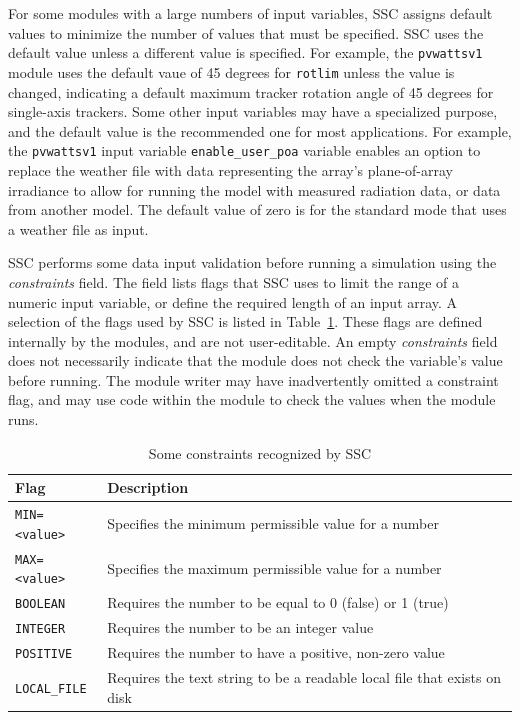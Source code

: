 \documentclass{scrartcl} %
\newcommand{\+}{\discretionary{\mbox{\scriptsize$\hookleftarrow$}}{}{}}
\begin{document}
For some modules with a large numbers of input variables, SSC assigns default values to minimize the number of values that must be specified. SSC uses the default value unless a different value is specified. For example, the \texttt{pvwattsv1} module uses the default vaue of 45 degrees for \texttt{rotlim} unless the value is changed, indicating a default maximum tracker rotation angle of 45 degrees for single-axis trackers. Some other input variables may have a specialized purpose, and the default value is the recommended one for most applications. For example, the \texttt{pvwattsv1} input variable \texttt{enable\_user\_poa} variable enables an option to replace the weather file with data representing the array's plane-of-array irradiance to allow for running the model with measured radiation data, or data from another model. The default value of zero is for the standard mode that uses a weather file as input.

SSC performs some data input validation before running a simulation using the \emph{constraints} field. The field lists flags that SSC uses to limit the range of a numeric input variable, or define the required length of an input array.  A selection of the flags used by SSC is listed in Table~\ref{tab_constraints}.  These flags are defined internally by the modules, and are not user-editable. An empty \emph{constraints} field does not necessarily indicate that the module does not check the variable's value before running. The module writer may have inadvertently omitted a constraint flag, and may use code within the module to check the values when the module runs.

\begin{table}[ht]
\begin{center}
\begin{tabular}{ll}
Flag & Description\\
\hline
\texttt{MIN=<value>} & Specifies the minimum permissible value for a number \\
\texttt{MAX=<value>} & Specifies the maximum permissible value for a number \\
\texttt{BOOLEAN} & Requires the number to be equal to 0 (false) or 1 (true) \\
\texttt{INTEGER} & Requires the number to be an integer value \\
\texttt{POSITIVE} & Requires the number to have a positive, non-zero value \\
\texttt{LOCAL\_FILE} & Requires the text string to be a readable local file that exists on disk \\
\end{tabular}
\caption{Some constraints recognized by SSC}
\label{tab_constraints}
\end{center}
\end{table}
\end{document}
